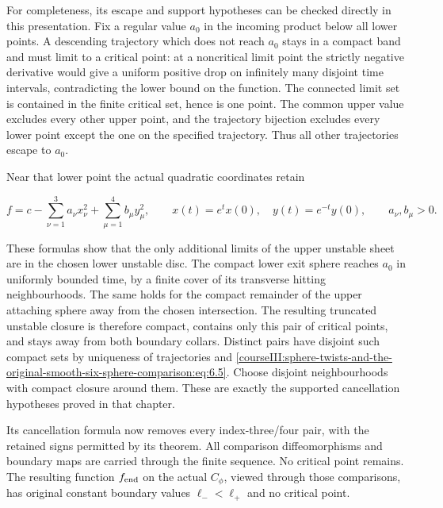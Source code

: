 For completeness, its escape and support hypotheses can be checked directly in this presentation. Fix a regular value \(a_0\) in the incoming product below all lower points. A descending trajectory which does not reach \(a_0\) stays in a compact band and must limit to a critical point: at a noncritical limit point the strictly negative derivative would give a uniform positive drop on infinitely many disjoint time intervals, contradicting the lower bound on the function. The connected limit set is contained in the finite critical set, hence is one point. The common upper value excludes every other upper point, and the trajectory bijection excludes every lower point except the one on the specified trajectory. Thus all other trajectories escape to \(a_0\).

Near that lower point the actual quadratic coordinates retain

\begin{equation}
f=c-\sum_{\nu=1}^3 a_\nu x_\nu^2+
                     \sum_{\mu=1}^4 b_\mu y_\mu^2,\qquad
 x(t)=e^t x(0),\quad y(t)=e^{-t}y(0),\qquad a_\nu,b_\mu>0 .
 \label{courseIII:sphere-twists-and-the-original-smooth-six-sphere-comparison:eq:6.6}
\end{equation}

These formulas show that the only additional limits of the upper unstable sheet are in the chosen lower unstable disc. The compact lower exit sphere reaches \(a_0\) in uniformly bounded time, by a finite cover of its transverse hitting neighbourhoods. The same holds for the compact remainder of the upper attaching sphere away from the chosen intersection. The resulting truncated unstable closure is therefore compact, contains only this pair of critical points, and stays away from both boundary collars. Distinct pairs have disjoint such compact sets by uniqueness of trajectories and \eqref{courseIII:sphere-twists-and-the-original-smooth-six-sphere-comparison:eq:6.5}. Choose disjoint neighbourhoods with compact closure around them. These are exactly the supported cancellation hypotheses proved in that chapter.

Its cancellation formula now removes every index-three/four pair, with the retained signs permitted by its theorem. All comparison diffeomorphisms and boundary maps are carried through the finite sequence. No critical point remains. The resulting function \(f_{\rm end}\) on the actual \(C_\phi\), viewed through those comparisons, has original constant boundary values \(\ell_-<\ell_+\) and no critical point.

